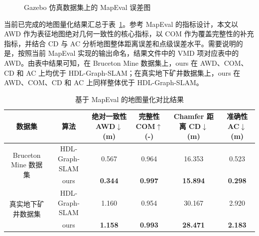 \begin{figure}[htbp]
    \centering
    \caption{Gazebo 仿真数据集上的 MapEval 误差图}
    \label{fig:gazebo_mapeval_error}
\end{figure}

当前已完成的地图量化结果汇总于表~\ref{tab:mapeval_summary}。参考 MapEval 的指标设计，本文以 AWD 作为表征地图绝对几何一致性的核心指标，以 COM 作为覆盖完整性的补充指标，并结合 CD 与 AC 分析地图整体距离误差和点级误差水平。需要说明的是，按照当前 MapEval 实现的输出命名，结果文件中的 VMD 项对应表中的 AWD。由表中结果可知，在 Bruceton Mine 数据集上，ours 在 AWD、COM、CD 和 AC 上均优于 HDL-Graph-SLAM；在真实地下矿井数据集上，ours 在 AWD、COM、CD 和 AC 上同样整体优于 HDL-Graph-SLAM。

\begin{table}[htbp]
    \centering
    \caption{基于 MapEval 的地图量化对比结果}
    \label{tab:mapeval_summary}
    \small
    \begin{tabular}{cccccc}
        \toprule
        数据集 & 算法 & \shortstack{绝对一致性\\AWD$\downarrow$ (m)} & \shortstack{完整性\\COM$\uparrow$ (-)} & \shortstack{Chamfer 距离\\CD$\downarrow$ (m)} & \shortstack{准确性\\AC$\downarrow$ (m)} \\
        \midrule
        \multirow{2}{*}{Bruceton Mine 数据集} & HDL-Graph-SLAM & 0.567 & 0.964 & 16.353 & 0.523 \\
         & ours & \textbf{0.344} & \textbf{0.997} & \textbf{15.894} & \textbf{0.298} \\
        \multirow{2}{*}{真实地下矿井数据集} & HDL-Graph-SLAM & 1.160 & 0.954 & 30.167 & 2.920 \\
         & ours & \textbf{1.158} & \textbf{0.993} & \textbf{28.471} & \textbf{2.183} \\
        \bottomrule
    \end{tabular}
\end{table}

